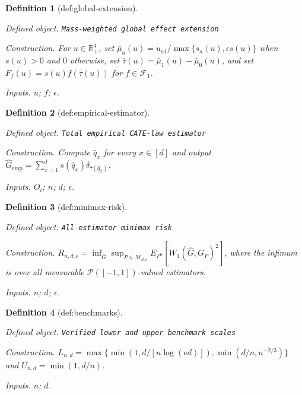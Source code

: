 \documentclass{article}
\newtheorem{definition}{Definition}
\begin{document}
\begin{definition}[def:global-extension]\label{def:global-extension}
\par\smallskip\noindent\emph{Defined object.} \texttt{Mass-\allowbreak{}weighted global effect extension}
\par\smallskip\noindent\emph{Construction.} For \(u\in\mathbb R_+^4\), set \(\bar\mu_a(u)=u_{a1}/\max\{s_a(u),\epsilon s(u)\}\) when \(s(u)>0\) and \(0\) otherwise, set \(\bar\tau(u)=\bar\mu_1(u)-\bar\mu_0(u)\), and set \(F_f(u)=s(u)f(\bar\tau(u))\) for \(f\in\mathcal F_1\).
\par\smallskip\noindent\emph{Inputs.} \(u\); \(f\); \(\epsilon\).
\end{definition}

\begin{definition}[def:empirical-estimator]\label{def:empirical-estimator}
\par\smallskip\noindent\emph{Defined object.} \texttt{Total empirical CATE-\allowbreak{}law estimator}
\par\smallskip\noindent\emph{Construction.} Compute \(\widehat q_x\) for every \(x\in[d]\) and output \(\widehat G_{\mathrm{emp}}=\sum_{x=1}^d s(\widehat q_x)\delta_{\bar\tau(\widehat q_x)}\).
\par\smallskip\noindent\emph{Inputs.} \(O_i\); \(n\); \(d\); \(\epsilon\).
\end{definition}

\begin{definition}[def:minimax-risk]\label{def:minimax-risk}
\par\smallskip\noindent\emph{Defined object.} \texttt{All-\allowbreak{}estimator minimax risk}
\par\smallskip\noindent\emph{Construction.} \(R_{n,d,\epsilon}=\inf_{\widehat G}\sup_{P\in\mathcal M_{d,\epsilon}}E_{P^n}[W_1(\widehat G,G_P)^2]\), where the infimum is over all measurable \(\mathcal P([-1,1])\)-valued estimators.
\par\smallskip\noindent\emph{Inputs.} \(n\); \(d\); \(\epsilon\).
\end{definition}

\begin{definition}[def:benchmarks]\label{def:benchmarks}
\par\smallskip\noindent\emph{Defined object.} \texttt{Verified lower and upper benchmark scales}
\par\smallskip\noindent\emph{Construction.} \(L_{n,d}=\max\{\min(1,d/[n\log(ed)]),\min(d/n,n^{-2/3})\}\) and \(U_{n,d}=\min(1,d/n)\).
\par\smallskip\noindent\emph{Inputs.} \(n\); \(d\).
\end{definition}
\end{document}
